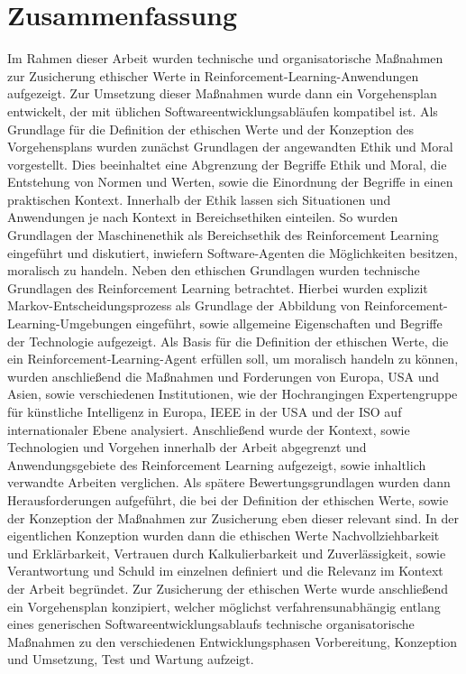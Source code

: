 \chapter{Zusammenfassung}\label{chap:zusammenfassung}
Im Rahmen dieser Arbeit wurden technische und organisatorische Maßnahmen zur Zusicherung ethischer Werte in Reinforcement-Learning-Anwendungen aufgezeigt.
Zur Umsetzung dieser Maßnahmen wurde dann ein Vorgehensplan entwickelt, der mit üblichen Softwareentwicklungsabläufen kompatibel ist.
Als Grundlage für die Definition der ethischen Werte und der Konzeption des Vorgehensplans wurden zunächst Grundlagen der angewandten Ethik und Moral vorgestellt.
Dies beeinhaltet eine Abgrenzung der Begriffe Ethik und Moral, die Entstehung von Normen und Werten, sowie die Einordnung der Begriffe in einen praktischen Kontext.
Innerhalb der Ethik lassen sich Situationen und Anwendungen je nach Kontext in Bereichsethiken einteilen.
So wurden Grundlagen der Maschinenethik als Bereichsethik des Reinforcement Learning eingeführt und diskutiert, inwiefern Software-Agenten die Möglichkeiten besitzen, moralisch zu handeln.
Neben den ethischen Grundlagen wurden technische Grundlagen des Reinforcement Learning betrachtet.
Hierbei wurden explizit Markov-Entscheidungsprozess als Grundlage der Abbildung von Reinforcement-Learning-Umgebungen eingeführt, sowie allgemeine Eigenschaften und Begriffe der Technologie aufgezeigt.
Als Basis für die Definition der ethischen Werte, die ein Reinforcement-Learning-Agent erfüllen soll, um moralisch handeln zu können, wurden anschließend die Maßnahmen und Forderungen von Europa, USA und Asien, sowie verschiedenen Institutionen, wie der Hochrangingen Expertengruppe für künstliche Intelligenz in Europa, IEEE in der USA und der ISO auf internationaler Ebene analysiert.
Anschließend wurde der Kontext, sowie Technologien und Vorgehen innerhalb der Arbeit abgegrenzt und Anwendungsgebiete des Reinforcement Learning aufgezeigt, sowie inhaltlich verwandte Arbeiten verglichen.
Als spätere Bewertungsgrundlagen wurden dann Herausforderungen aufgeführt, die bei der Definition der ethischen Werte, sowie der Konzeption der Maßnahmen zur Zusicherung eben dieser relevant sind.
In der eigentlichen Konzeption wurden dann die ethischen Werte Nachvollziehbarkeit und Erklärbarkeit, Vertrauen durch Kalkulierbarkeit und Zuverlässigkeit, sowie Verantwortung und Schuld im einzelnen definiert und die Relevanz im Kontext der Arbeit begründet.
Zur Zusicherung der ethischen Werte wurde anschließend ein Vorgehensplan konzipiert, welcher möglichst verfahrensunabhängig entlang eines generischen Softwareentwicklungsablaufs technische organisatorische Maßnahmen zu den verschiedenen Entwicklungsphasen Vorbereitung, Konzeption und Umsetzung, Test und Wartung aufzeigt.
